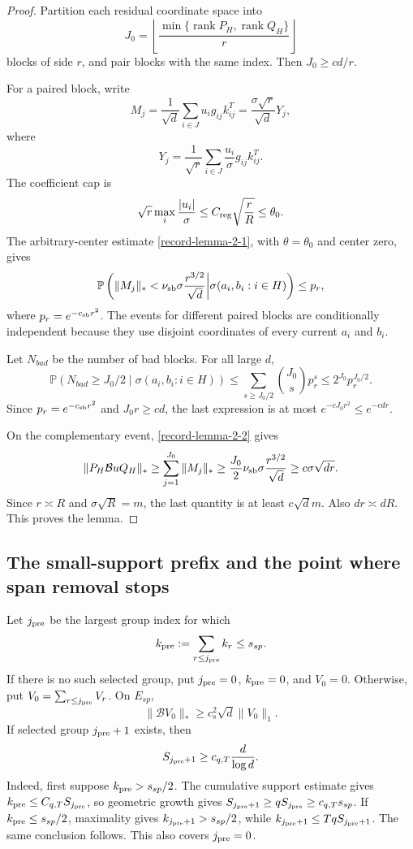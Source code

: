 \documentclass[11pt]{article}
\numberwithin{equation}{section}
\theoremstyle{definition}
\theoremstyle{remark}
\newcommand{\Pp}{\mathbb P}
\newcommand{\1}{\boldsymbol 1}
\begin{document}
\begin{aiblock}
\begin{proof}
  Partition each residual coordinate space into
  \[
    J_0=\left\lfloor\frac{\min\{\operatorname{rank}
    P_H,\operatorname{rank}Q_H\}}r\right\rfloor
  \]
  blocks of side $r$, and pair blocks with the same
  index. Then $J_0\ge c d/r$.

  For a paired block, write
  \[
    M_j=\frac1{\sqrt d}\sum_{i\in J}u_i
    g_{ij}k_{ij}^T = \frac{\sigma\sqrt r}{\sqrt d}Y_j,
  \]
  where
  \[
    Y_j=\frac1{\sqrt r}\sum_{i\in J}\frac{u_i}{\sigma}
    g_{ij}k_{ij}^T.
  \]
  The coefficient cap is
  \[
    \sqrt r\max_i\frac{|u_i|}{\sigma} \le
    C_{\rm reg}\sqrt{\frac rR} \le\theta_0.
  \]
  The arbitrary-center estimate
  \cref{record-lemma-2-1}, with $\theta=\theta_0$ and
  center zero, gives
  \[
    \Pp\left(\|M_j\|_*<\nu_{\rm sb}\sigma
    \frac{r^{3/2}}{\sqrt d}\middle|\sigma(a_i,b_i:i\in
    H)\right)\le p_r,
  \]
  where $p_r=e^{-c_{\rm sb}r^2}$. The events for
  different paired blocks are conditionally independent
  because they use disjoint coordinates of every current
  $a_i$ and $b_i$.

  Let $N_{bad}$ be the number of bad blocks. For all
  large $d$,
  \[
    \Pp(N_{bad}\ge J_0/2\mid\sigma(a_i,b_i:i\in H))
    \le \sum_{s\ge J_0/2}\binom{J_0}{s}p_r^s \le
    2^{J_0}p_r^{J_0/2}.
  \]
  Since $p_r=e^{-c_{\rm sb}r^2}$ and $J_0r\ge cd$, the
  last expression is at most
  $e^{-cJ_0r^2}\le e^{-cdr}$.

  On the complementary event,
  \cref{record-lemma-2-2} gives
  \[
    \|P_H\mathcal{B}uQ_H\|_* \ge
    \sum_{j=1}^{J_0}\|M_j\|_* \ge \frac{J_0}{2}
    \nu_{\rm sb}\sigma\frac{r^{3/2}}{\sqrt d} \ge
    c\sigma\sqrt{dr}.
  \]
  Since $r\asymp R$ and $\sigma\sqrt R=m$, the last
  quantity is at least $c\sqrt d m$. Also $dr\asymp dR$.
  This proves the lemma.
\end{proof}

\subsection{The small-support prefix and the point
  where span removal
  stops}\label{sparse-prefix-and-span-cutoff}

Let $j_{\rm pre}$ be the largest group index for which
\[
  k_{\rm pre}:=\sum_{r\le j_{\rm pre}}k_{r}\le s_{sp}.
\]
If there is no such selected group, put
$j_{\rm pre}=0$, $k_{\rm pre}=0$, and $V_{0}=0$.
Otherwise, put $V_{0}=\sum_{r\le j_{\rm pre}}V_{r}$.
On $E_{sp}$,
\[
  \|\mathcal{B}V_{0}\|_{*}\ge c_{s}^{2}\sqrt{d}\|V_{0}\|_{1}.
\]
If selected group $j_{\rm pre}+1$ exists, then
\[
  S_{j_{\rm pre}+1}\ge c_{q,T}\frac{d}{\log d}.
\]
Indeed, first suppose $k_{\rm pre}>s_{sp}/2$. The
cumulative support estimate gives
$k_{\rm pre}\le C_{q,T}S_{j_{\rm pre}}$, so geometric
growth gives
$S_{j_{\rm pre}+1}\ge qS_{j_{\rm pre}}\ge
c_{q,T}s_{sp}$. If $k_{\rm pre}\le s_{sp}/2$,
maximality gives $k_{j_{\rm pre}+1}>s_{sp}/2$,
while $k_{j_{\rm pre}+1}\le TqS_{j_{\rm pre}+1}$.
The same conclusion follows. This also covers
$j_{\rm pre}=0$.


\end{aiblock}
\end{document}
